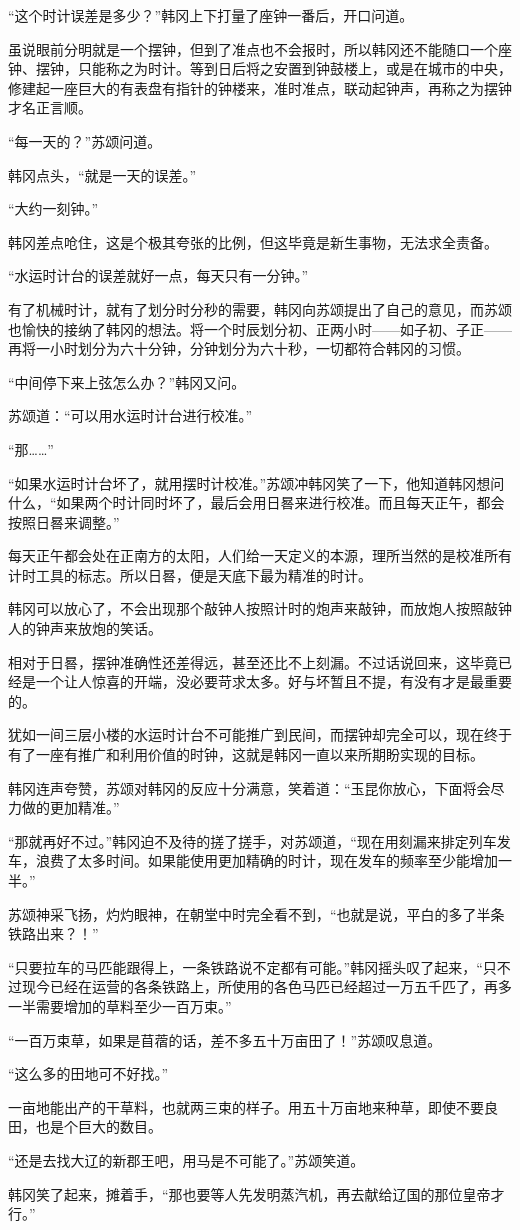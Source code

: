 “这个时计误差是多少？”韩冈上下打量了座钟一番后，开口问道。

虽说眼前分明就是一个摆钟，但到了准点也不会报时，所以韩冈还不能随口一个座钟、摆钟，只能称之为时计。等到日后将之安置到钟鼓楼上，或是在城市的中央，修建起一座巨大的有表盘有指针的钟楼来，准时准点，联动起钟声，再称之为摆钟才名正言顺。

“每一天的？”苏颂问道。

韩冈点头，“就是一天的误差。”

“大约一刻钟。”

韩冈差点呛住，这是个极其夸张的比例，但这毕竟是新生事物，无法求全责备。

“水运时计台的误差就好一点，每天只有一分钟。”

有了机械时计，就有了划分时分秒的需要，韩冈向苏颂提出了自己的意见，而苏颂也愉快的接纳了韩冈的想法。将一个时辰划分初、正两小时——如子初、子正——再将一小时划分为六十分钟，分钟划分为六十秒，一切都符合韩冈的习惯。

“中间停下来上弦怎么办？”韩冈又问。

苏颂道：“可以用水运时计台进行校准。”

“那……”

“如果水运时计台坏了，就用摆时计校准。”苏颂冲韩冈笑了一下，他知道韩冈想问什么，“如果两个时计同时坏了，最后会用日晷来进行校准。而且每天正午，都会按照日晷来调整。”

每天正午都会处在正南方的太阳，人们给一天定义的本源，理所当然的是校准所有计时工具的标志。所以日晷，便是天底下最为精准的时计。

韩冈可以放心了，不会出现那个敲钟人按照计时的炮声来敲钟，而放炮人按照敲钟人的钟声来放炮的笑话。

相对于日晷，摆钟准确性还差得远，甚至还比不上刻漏。不过话说回来，这毕竟已经是一个让人惊喜的开端，没必要苛求太多。好与坏暂且不提，有没有才是最重要的。

犹如一间三层小楼的水运时计台不可能推广到民间，而摆钟却完全可以，现在终于有了一座有推广和利用价值的时钟，这就是韩冈一直以来所期盼实现的目标。

韩冈连声夸赞，苏颂对韩冈的反应十分满意，笑着道：“玉昆你放心，下面将会尽力做的更加精准。”

“那就再好不过。”韩冈迫不及待的搓了搓手，对苏颂道，“现在用刻漏来排定列车发车，浪费了太多时间。如果能使用更加精确的时计，现在发车的频率至少能增加一半。”

苏颂神采飞扬，灼灼眼神，在朝堂中时完全看不到，“也就是说，平白的多了半条铁路出来？！”

“只要拉车的马匹能跟得上，一条铁路说不定都有可能。”韩冈摇头叹了起来，“只不过现今已经在运营的各条铁路上，所使用的各色马匹已经超过一万五千匹了，再多一半需要增加的草料至少一百万束。”

“一百万束草，如果是苜蓿的话，差不多五十万亩田了！”苏颂叹息道。

“这么多的田地可不好找。”

一亩地能出产的干草料，也就两三束的样子。用五十万亩地来种草，即使不要良田，也是个巨大的数目。

“还是去找大辽的新郡王吧，用马是不可能了。”苏颂笑道。

韩冈笑了起来，摊着手，“那也要等人先发明蒸汽机，再去献给辽国的那位皇帝才行。”
